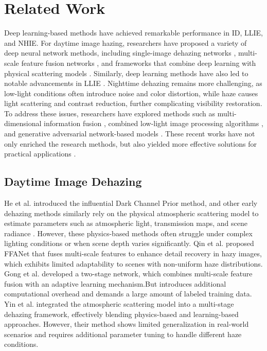 \section{Related Work}
\label{sec:relatedwork}
%
    Deep learning-based methods have achieved remarkable performance in ID, LLIE, and NHIE. For daytime image hazing, researchers have proposed a variety of deep neural network methods, including single-image dehazing networks \cite{qin2020ffa,song2023vision,cai2016dehazenet,li2017aod}, multi-scale feature fusion networks \cite{xu2024mvksr,gong2024tsnet}, and frameworks that combine deep learning with physical scattering models \cite{lu2024aosrnet,yin2024multi}. Similarly, deep learning methods have also led to notable advancements in LLIE \cite{liu2022rank,lin2023smnet,hou2024global,guo2020zero,wu2022uretinex}. Nighttime dehazing remains more challenging, as low-light conditions often introduce noise and color distortion, while haze causes light scattering and contrast reduction, further complicating visibility restoration. To address these issues, researchers have explored methods such as multi-dimensional information fusion \cite{liao2018hdp,cong2024semi}, combined low-light image processing algorithms \cite{li2015nighttime,jin2023enhancing,zhang2016nighttime}, and generative adversarial network-based models \cite{zheng20234k,koo2020nighttime}. These recent works have not only enriched the research methods, but also yielded more effective solutions for practical applications \cite{zhang2019kindling}.
%    
\subsection{Daytime Image Dehazing}
%
    He et al. \cite{he2010single} introduced the influential Dark Channel Prior method, and other early dehazing methods similarly rely on the physical atmospheric scattering model to estimate parameters such as atmospheric light, transmission maps, and scene radiance \cite{yu2011fast,fattal2014dehazing}. However, these physics-based methods often struggle under complex lighting conditions or when scene depth varies significantly. Qin et al. \cite{qin2020ffa} proposed FFANet that fuses multi-scale features to enhance detail recovery in hazy images, which exhibits limited adaptability to scenes with non-uniform haze distributions. Gong et al. \cite{gong2024tsnet} developed a two-stage network, which combines multi-scale feature fusion with an adaptive learning mechanism.But introduces additional computational overhead and demands a large amount of labeled training data. Yin et al. \cite{yin2024multi} integrated the atmospheric scattering model into a multi-stage dehazing framework, effectively blending physics-based and learning-based approaches. However, their method shows limited generalization in real-world scenarios and requires additional parameter tuning to handle different haze conditions.
%    
